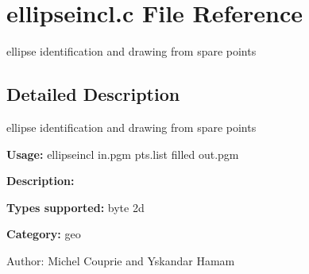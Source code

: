 \section{ellipseincl.c File Reference}
\label{ellipseincl_8c}
ellipse identification and drawing from spare points 



\subsection{Detailed Description}
ellipse identification and drawing from spare points 

{\bf Usage:} ellipseincl in.pgm pts.list filled out.pgm

{\bf Description:}

{\bf Types supported:} byte 2d

{\bf Category:} geo

\begin{Desc}
\item[Author:]Michel Couprie and Yskandar Hamam \end{Desc}
